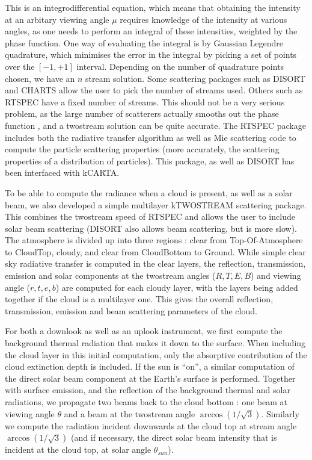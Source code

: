 \documentclass[11pt]{article}
\begin{document}
This is an integrodifferential equation, which means that obtaining
the intensity at an arbitary viewing angle $\mu$ requires knowledge of the 
intensity at various angles, as one needs to perform an integral of these
intensities, weighted by the phase function. One way of evaluating the 
integral is by
Gaussian Legendre quadrature, which minimises the error in the integral by
picking a set of points over the $[-1,+1]$ interval. Depending on the number
of quadrature points chosen, we have an $n$ stream solution. Some scattering
packages such as \textsf{DISORT} and \textsf{CHARTS} allow the user to pick
the number of streams used. Others such as \textsf{RTSPEC} have a fixed 
number of streams. This should not be a very serious problem, as the large 
number of scatterers actually smooths out the phase function \cite{dee:98}, 
and a twostream solution can be quite accurate. The \textsf{RTSPEC} package
includes both the radiative transfer algorithm as well as Mie scattering code
to compute the particle scattering properties (more accurately, the scattering
properties of a distribution of particles). This package, as well as 
\textsf{DISORT} has been interfaced with \textsf{kCARTA}. 

To be able to compute the radiance when a cloud is present, as well as a 
solar beam, we also developed a simple multilayer \textsf{kTWOSTREAM} 
scattering package. This combines the twostream speed of \textsf{RTSPEC} and 
allows the user to include solar beam scattering (\textsf{DISORT} also allows
beam scattering, but is more slow). The atmosphere is divided up into three 
regions : clear from 
Top-Of-Atmosphere to CloudTop, cloudy, and clear from CloudBottom to Ground.
While simple clear sky radiative transfer is computed in the clear layers, the
reflection, transmission, emission and solar components at the twostream 
angles ($R,T,E,B$) and viewing angle ($r,t,e,b$) are computed for each cloudy
layer, with the layers being added together if the cloud is a multilayer one.
This gives the overall reflection, transmission, emission and beam 
scattering parameters of the cloud.
 
For both a downlook as well as an uplook instrument, we first compute the 
background thermal radiation that makes it down to the surface. 
When including the cloud layer in this initial computation, only the 
absorptive contribution of the cloud extinction depth is included. If the sun
is ``on'', a similar computation of the direct solar beam component at the
Earth's surface is performed. Together with surface emission, and the 
reflection of the background thermal and solar radiations, we propagate two 
beams back to the cloud bottom : one beam at viewing angle $\theta$ and a 
beam at the twostream angle $\arccos(1/\sqrt3)$. Similarly we compute the 
radiation incident downwards at the cloud top at stream angle 
$\arccos(1/\sqrt3)$ (and if necessary, the direct solar beam intensity that 
is incident at the cloud top, at solar angle $\theta_{sun}$). 
\end{document}
